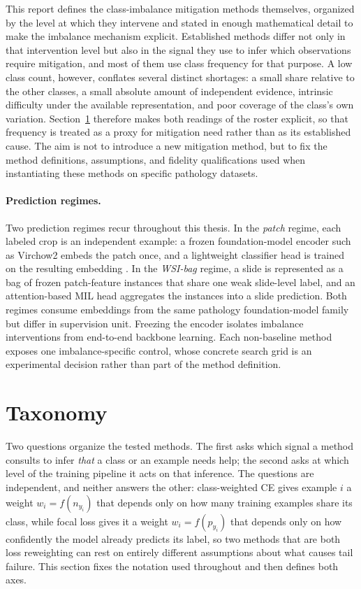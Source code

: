 \documentclass[11pt]{article}
\begin{document}
This report defines the class-imbalance mitigation methods themselves, organized by the level at which they intervene and stated in enough mathematical detail to make the imbalance mechanism explicit. Established methods differ not only in that intervention level but also in the signal they use to infer which observations require mitigation, and most of them use class frequency for that purpose. A low class count, however, conflates several distinct shortages: a small share relative to the other classes, a small absolute amount of independent evidence, intrinsic difficulty under the available representation, and poor coverage of the class's own variation. Section~\ref{sec:taxonomy} therefore makes both readings of the roster explicit, so that frequency is treated as a proxy for mitigation need rather than as its established cause. The aim is not to introduce a new mitigation method, but to fix the method definitions, assumptions, and fidelity qualifications used when instantiating these methods on specific pathology datasets.

\paragraph{Prediction regimes.}
Two prediction regimes recur throughout this thesis. In the \emph{patch} regime, each labeled crop is an independent example: a frozen foundation-model encoder such as Virchow2 embeds the patch once, and a lightweight classifier head is trained on the resulting embedding \citep{zimmermann2024virchow2,vorontsov2024virchow}. In the \emph{WSI-bag} regime, a slide is represented as a bag of frozen patch-feature instances that share one weak slide-level label, and an attention-based MIL head aggregates the instances into a slide prediction. Both regimes consume embeddings from the same pathology foundation-model family but differ in supervision unit. Freezing the encoder isolates imbalance interventions from end-to-end backbone learning. Each non-baseline method exposes one imbalance-specific control, whose concrete search grid is an experimental decision rather than part of the method definition.

\section{Taxonomy}
\label{sec:taxonomy}
Two questions organize the tested methods. The first asks which signal a method consults to infer \emph{that} a class or an example needs help; the second asks at which level of the training pipeline it acts on that inference. The questions are independent, and neither answers the other: class-weighted CE gives example $i$ a weight $w_i=f(n_{y_i})$ that depends only on how many training examples share its class, while focal loss gives it a weight $w_i=f(p_{y_i})$ that depends only on how confidently the model already predicts its label, so two methods that are both loss reweighting can rest on entirely different assumptions about what causes tail failure. This section fixes the notation used throughout and then defines both axes.
\end{document}
